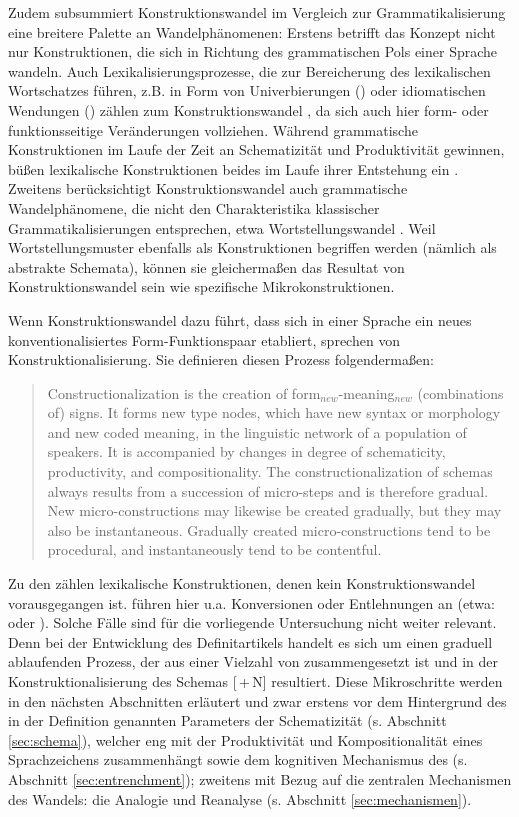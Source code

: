 Zudem subsummiert Konstruktionswandel im Vergleich zur Grammatikalisierung eine breitere Palette an Wandelphänomenen: Erstens betrifft das Konzept nicht nur Konstruktionen, die sich in Richtung des grammatischen Pols einer Sprache wandeln. Auch Lexikalisierungsprozesse, die zur Bereicherung des lexikalischen Wortschatzes führen, z.B. in Form von Univerbierungen () oder idiomatischen Wendungen () zählen zum Konstruktionswandel \parencite[64]{Hilpert2011}, da sich auch hier form- oder funktionsseitige Veränderungen vollziehen. Während grammatische Konstruktionen im Laufe der Zeit an Schematizität und Produktivität gewinnen, büßen lexikalische Konstruktionen beides im Laufe ihrer Entstehung ein \parencite[vgl.][164]{Traugott2013}. Zweitens berücksichtigt Konstruktionswandel auch grammatische Wandelphänomene, die nicht den Charakteristika klassischer Grammatikalisierungen entsprechen, etwa Wortstellungswandel \parencite[vgl.][65]{Hilpert2011}. Weil Wortstellungsmuster ebenfalls als Konstruktionen begriffen werden (nämlich als abstrakte Schemata), können sie gleichermaßen das Resultat von Konstruktionswandel sein wie spezifische Mikrokonstruktionen. 

Wenn Konstruktionswandel dazu führt, dass sich in einer Sprache ein neues konventionalisiertes Form-Funktionspaar etabliert, sprechen \textcite{Traugott2013} von Konstruktionalisierung. Sie definieren diesen Prozess folgendermaßen:  \blockcquote[22]{Traugott2013}{Constructionalization is the creation of form$_{new}$-meaning$_{new}$ (combinations of) signs. It forms new type nodes, which have new syntax or morphology and new coded meaning, in the linguistic network of a population of speakers. It is accompanied by changes in degree of schematicity,
productivity, and compositionality. The constructionalization of schemas
always results from a succession of micro-steps and is therefore gradual.
New micro-constructions may likewise be created gradually, but they may
also be instantaneous. Gradually created micro-constructions tend to be
procedural, and instantaneously tend to be
contentful.}

\noindent
Zu den  zählen lexikalische Konstruktionen, denen kein Konstruktionswandel vorausgegangen ist. \textcite[3]{Traugott2013} führen hier u.a. Konversionen oder Entlehnungen an (etwa:  oder ). Solche Fälle sind für die vorliegende Untersuchung nicht weiter relevant. Denn bei der Entwicklung des Definitartikels handelt es sich um einen graduell ablaufenden Prozess, der aus einer Vielzahl von  zusammengesetzt ist und in der Konstruktionalisierung des Schemas  [\,+\,N]  resultiert. Diese Mikroschritte werden in den nächsten Abschnitten erläutert und zwar erstens vor dem Hintergrund des in der Definition genannten Parameters der Schematizität (s. Abschnitt \ref{sec:schema}), welcher eng mit der Produktivität und Kompositionalität eines Sprachzeichens zusammenhängt sowie dem kognitiven Mechanismus des   (s.  Abschnitt \ref{sec:entrenchment}); zweitens mit Bezug auf die zentralen Mechanismen des Wandels: die Analogie und Reanalyse (s. Abschnitt \ref{sec:mechanismen}). 

